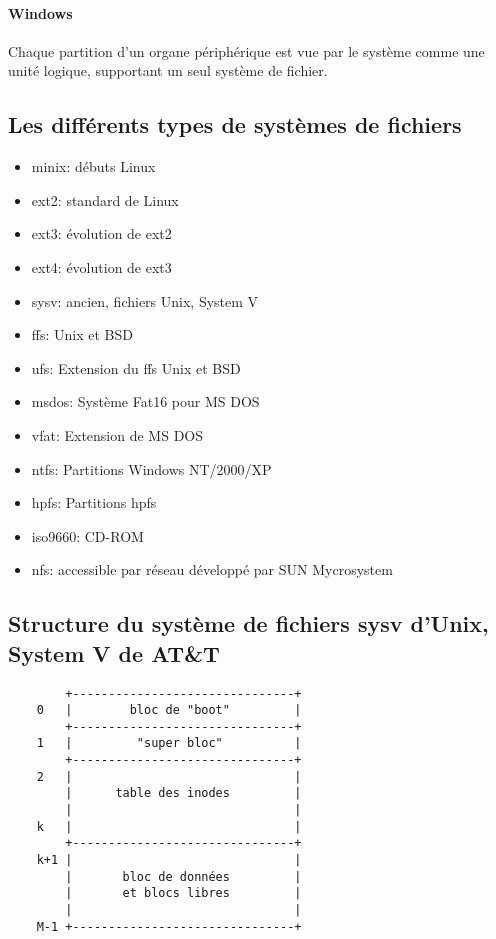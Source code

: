 \documentclass[12pt,a4paper,openany]{book}
\begin{document}
			\paragraph{Windows}
			Chaque partition d'un organe périphérique est vue par le système
			comme une unité logique, supportant un seul système de fichier.
			\paragraph{}
		\subsection{Les différents types de systèmes de fichiers}
			\begin{itemize}
				\item minix: débuts Linux
				\item ext2: standard de Linux
				\item ext3: évolution de ext2
				\item ext4: évolution de ext3
				\item sysv: ancien, fichiers Unix, System V
				\item ffs: Unix et BSD
				\item ufs: Extension du ffs Unix et BSD
				\item msdos: Système Fat16 pour MS DOS
				\item vfat: Extension de MS DOS
				\item ntfs: Partitions Windows NT/2000/XP
				\item hpfs: Partitions hpfs 
				\item iso9660: CD-ROM
				\item nfs: accessible par réseau développé par SUN Mycrosystem
			\end{itemize}
		\subsection{Structure du système de fichiers sysv d'Unix, System V de 
			AT\&T}
			\begin{verbatim}
	    +-------------------------------+
	0   |        bloc de "boot"         |
	    +-------------------------------+
	1   |         "super bloc"          |
	    +-------------------------------+
	2   |                               |
	    |      table des inodes         |	
	    |                               |
	k   |                               |
	    +-------------------------------+
	k+1 |                               |
	    |       bloc de données         |
	    |       et blocs libres	        |
	    |                               |
	M-1 +-------------------------------+

			\end{verbatim}
\end{document}
